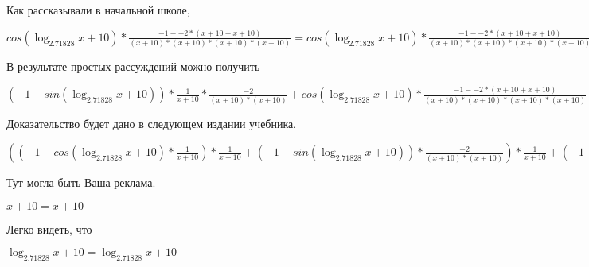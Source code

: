 \documentclass[12pt,a4paper,fleqn]{article}
\theoremstyle{definition}
\begin{document}
Как рассказывали в начальной школе,

$cos(\log_{ 2.71828 }{ x  +  10 }) * \frac{ -1  -  -2  * ( x  +  10  +  x  +  10 )}{( x  +  10 ) * ( x  +  10 ) * ( x  +  10 ) * ( x  +  10 )}
 = cos(\log_{ 2.71828 }{ x  +  10 }) * \frac{ -1  -  -2  * ( x  +  10  +  x  +  10 )}{( x  +  10 ) * ( x  +  10 ) * ( x  +  10 ) * ( x  +  10 )}
$

В результате простых рассуждений можно получить

$( -1  - sin(\log_{ 2.71828 }{ x  +  10 })) * \frac{ 1 }{ x  +  10 }
 * \frac{ -2 }{( x  +  10 ) * ( x  +  10 )}
 + cos(\log_{ 2.71828 }{ x  +  10 }) * \frac{ -1  -  -2  * ( x  +  10  +  x  +  10 )}{( x  +  10 ) * ( x  +  10 ) * ( x  +  10 ) * ( x  +  10 )}
 = ( -1  - sin(\log_{ 2.71828 }{ x  +  10 })) * \frac{ 1 }{ x  +  10 }
 * \frac{ -2 }{( x  +  10 ) * ( x  +  10 )}
 + cos(\log_{ 2.71828 }{ x  +  10 }) * \frac{ -1  -  -2  * ( x  +  10  +  x  +  10 )}{( x  +  10 ) * ( x  +  10 ) * ( x  +  10 ) * ( x  +  10 )}
$

Доказательство будет дано в следующем издании учебника.

$(( -1  - cos(\log_{ 2.71828 }{ x  +  10 }) * \frac{ 1 }{ x  +  10 }
) * \frac{ 1 }{ x  +  10 }
 + ( -1  - sin(\log_{ 2.71828 }{ x  +  10 })) * \frac{ -2 }{( x  +  10 ) * ( x  +  10 )}
) * \frac{ 1 }{ x  +  10 }
 + ( -1  - sin(\log_{ 2.71828 }{ x  +  10 })) * \frac{ 1 }{ x  +  10 }
 * \frac{ -2 }{( x  +  10 ) * ( x  +  10 )}
 + ( -1  - sin(\log_{ 2.71828 }{ x  +  10 })) * \frac{ 1 }{ x  +  10 }
 * \frac{ -2 }{( x  +  10 ) * ( x  +  10 )}
 + cos(\log_{ 2.71828 }{ x  +  10 }) * \frac{ -1  -  -2  * ( x  +  10  +  x  +  10 )}{( x  +  10 ) * ( x  +  10 ) * ( x  +  10 ) * ( x  +  10 )}
 = (( -1  - cos(\log_{ 2.71828 }{ x  +  10 }) * \frac{ 1 }{ x  +  10 }
) * \frac{ 1 }{ x  +  10 }
 + ( -1  - sin(\log_{ 2.71828 }{ x  +  10 })) * \frac{ -2 }{( x  +  10 ) * ( x  +  10 )}
) * \frac{ 1 }{ x  +  10 }
 + ( -1  - sin(\log_{ 2.71828 }{ x  +  10 })) * \frac{ 1 }{ x  +  10 }
 * \frac{ -2 }{( x  +  10 ) * ( x  +  10 )}
 + ( -1  - sin(\log_{ 2.71828 }{ x  +  10 })) * \frac{ 1 }{ x  +  10 }
 * \frac{ -2 }{( x  +  10 ) * ( x  +  10 )}
 + cos(\log_{ 2.71828 }{ x  +  10 }) * \frac{ -1  -  -2  * ( x  +  10  +  x  +  10 )}{( x  +  10 ) * ( x  +  10 ) * ( x  +  10 ) * ( x  +  10 )}
$

Тут могла быть Ваша реклама.

$ x  +  10  =  x  +  10 $

Легко видеть, что

$\log_{ 2.71828 }{ x  +  10 } = \log_{ 2.71828 }{ x  +  10 }$
\end{document}
